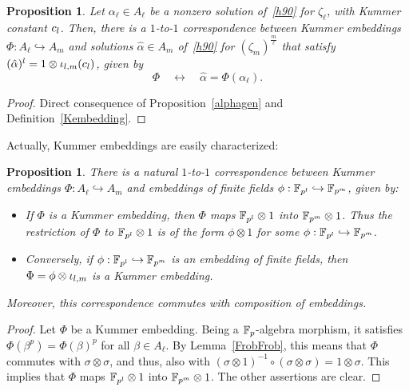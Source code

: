 \documentclass{sig-alternate}
\newtheorem{proposition}[theorem]{Proposition}
\begin{document}
\begin{proposition}
\label{Phialpha}
Let $\alpha_\ell\in A_\ell$ be a nonzero solution of~\eqref{h90} for $\zeta_\ell$, with Kummer constant $c_l$.
Then, there is a $1$-to-$1$ correspondence between Kummer embeddings $\Phi:A_\ell\hookrightarrow A_m$ and solutions $\hat{\alpha}\in A_m$
of~\eqref{h90} for $(\zeta_m)^{\frac{m}{\ell}}$ that satisfy $(\hat{\alpha})^l=1\otimes{\iota_{{l},{m}}}(c_l)$,
given by \[ \Phi\quad\longleftrightarrow\quad\hat{\alpha}=\Phi(\alpha_\ell). \]
\end{proposition}
\begin{proof}
Direct consequence of Proposition~\ref{alphagen} and Definition~\ref{Kembedding}.
\end{proof}

Actually, Kummer embeddings are easily characterized:
\begin{proposition}
\label{Phiphi}
There is a natural $1$-to-$1$ correspondence between Kummer embeddings $\Phi:A_\ell\hookrightarrow A_m$
and embeddings of finite fields $\phi:\mathbb{F}_{p^l}\hookrightarrow\mathbb{F}_{p^m}$, given by:
\begin{itemize}
\item If $\Phi$ is a Kummer embedding, then $\Phi$ maps $\mathbb{F}_{p^l}\otimes1$ into $\mathbb{F}_{p^m}\otimes 1$.
Thus the restriction of $\Phi$ to $\mathbb{F}_{p^l}\otimes1$ is of the form $\phi\otimes1$ for some $\phi:\mathbb{F}_{p^l}\hookrightarrow\mathbb{F}_{p^m}$.
\item Conversely, if $\phi:\mathbb{F}_{p^l}\hookrightarrow\mathbb{F}_{p^m}$ is an embedding of finite fields, then $\Phi=\phi\otimes{\iota_{{l},{m}}}$
is a Kummer embedding.
\end{itemize}
Moreover, this correspondence commutes with composition of embeddings.
\end{proposition}
\begin{proof}
Let $\Phi$ be a Kummer embedding. Being a $\mathbb{F}_{p}$-algebra morphism, it satisfies $\Phi(\beta^p)=\Phi(\beta)^p$ for all $\beta\in A_\ell$.
By Lemma~\ref{FrobFrob}, this means that $\Phi$ commutes with $\sigma\otimes\sigma$, and thus,
also with $(\sigma\otimes 1)^{-1}\circ(\sigma\otimes\sigma)=1\otimes\sigma$.
This implies that $\Phi$ maps $\mathbb{F}_{p^l}\otimes1$ into $\mathbb{F}_{p^m}\otimes 1$.
The other assertions are clear.
\end{proof}
\end{document}
